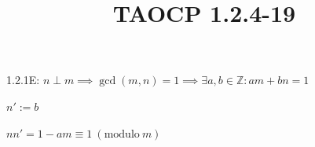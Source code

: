\documentclass{article}
\title{TAOCP 1.2.4\mbox{-}19}
\begin{document}
\maketitle

1.2.1E\@: \( n \perp m \implies \gcd(m,n) = 1 \implies \exists a, b \in \mathbb{Z}: am + bn = 1 \)

\( n' := b \)

\( nn' = 1 - am \equiv 1\ (\mathrm{modulo}\ m) \)
\end{document}
